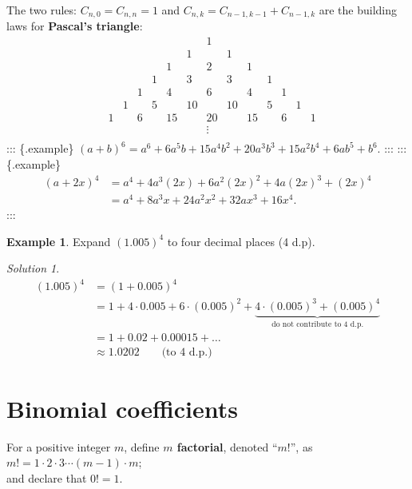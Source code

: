 \documentclass[
  12pt,
  oneside]{book}
\theoremstyle{definition}
\theoremstyle{definition}
\newtheorem{example}{Example}[chapter]
\theoremstyle{definition}
\theoremstyle{definition}
\theoremstyle{remark}
\newtheorem*{solution}{Solution}
\begin{document}
The two rules: \(C_{n,0}=C_{n,n}=1\) and \(C_{n,k}=C_{n-1,k-1}+C_{n-1,k}\) are the building laws for \textbf{Pascal's triangle}:
\[
\begin{array}{cccccccccccccc}
    &  &  &  &  &  &  &1 &  &  &  &  &  &   \\
    &  &  &  &  &  &1 &  &1 &  &  &  &  &   \\
    &  &  &  &  &1 &  &2 &  &1 &  &  &  &   \\
    &  &  &  &1 &  &3 &  &3 &  &1 &  &  &   \\
    &  &  &1 &  &4 &  &6 &  &4 &  &1 &  &   \\
    &  &1 &  &5 &  &10&  &10&  &5 &  &1 &   \\
    &1 &  &6 &  &15&  &20&  &15&  &6 &  &1  \\
    &  &  &  &  &  &  &\vdots&  &  &  &  &  &   \\
\end{array}
\]
::: \{.example\}
\((a+b)^6 = a^6 + 6 a^5b + 15 a^4b^2 + 20 a^3b^3 + 15 a^2b^4 + 6 ab^5 + b^6\).
:::
::: \{.example\}
\begin{align*}(a+2x)^4 &= a^4 + 4a^3(2x) + 6a^2(2x)^2 + 4a(2x)^3+(2x)^4\\
&= a^4 +8a^3x+24a^2x^2+32ax^3+16x^4.
\end{align*}
:::

\begin{example}
Expand \((1.005)^4\) to four decimal places (4 d.p).
\end{example}

\begin{solution}
\begin{align*}
(1.005)^4 &= (1+0.005)^4\\
&= 1+ 4\cdot 0.005 + 6\cdot (0.005)^2 + \underbrace{4\cdot(0.005)^3 + (0.005)^4}_{\text{do not contribute to 4 d.p.}}\\
&= 1+0.02 + 0.00015 + \dots \\
&\approx 1.0202\quad\quad\text{(to 4 d.p.)}
\end{align*}
\end{solution}

\hypertarget{binomial-coefficients}{%
\section{Binomial coefficients}\label{binomial-coefficients}}

For a positive integer \(m\), define \textbf{\(m\) factorial}, denoted ``\(m!\)'', as
\(m!=1\cdot2\cdot 3\cdots (m-1)\cdot m\);\\
and declare that \(0!=1\).
\end{document}
